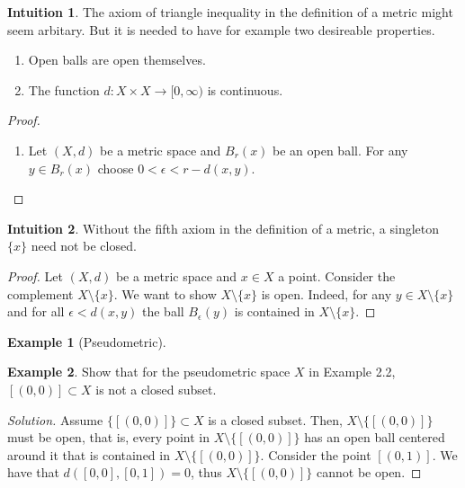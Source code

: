 \documentclass[a4paper]{book}
\theoremstyle{definition}
\newtheorem{example}{Example}[definition]
\newtheorem*{intuition}{Intuition}
\begin{document}
\begin{intbox}
    \begin{intuition}
        The axiom of triangle inequality in the definition of a metric might seem arbitary. But it is needed to have for example two desireable properties.
        \begin{enumerate}
            \item Open balls are open themselves.
            \item The function \(d: X \times X \longrightarrow [0, \infty)\) is continuous.
        \end{enumerate}
    \end{intuition}
\end{intbox}
\begin{proof}
    \begin{enumerate}
        \item Let \((X, d)\) be a metric space and \(B_r(x)\) be an open ball. For any \(y \in B_r(x)\) choose \(0 < \epsilon < r - d(x, y)\). 
    \end{enumerate}
\end{proof}
\begin{intbox}
    \begin{intuition}
        Without the fifth axiom in the definition of a metric, a singleton \(\{x\}\) need not be closed.
    \end{intuition}
\end{intbox}
\begin{proof}
    Let \((X, d)\) be a metric space and \(x \in X\) a point. Consider the complement \(X \setminus \{x\}\). We want to show \(X \setminus \{x\}\) is open. Indeed, for any \(y \in X \setminus \{x\}\) and for all \(\epsilon < d(x, y)\) the ball \(B_\epsilon(y)\) is contained in \(X \setminus \{x\}\).
\end{proof}

\begin{exmbox}
    \begin{example}[Pseudometric]
        
    \end{example}
\end{exmbox}

\begin{example}
    Show that for the pseudometric space \(X\) in Example 2.2, \([(0, 0)] \subset X\) is not a closed subset.
\end{example}
\begin{proof}[Solution]
    Assume \(\{[(0, 0)]\} \subset X\) is a closed subset. Then, \(X \setminus \{[(0, 0)]\}\) must be open, that is, every point in \(X \setminus \{[(0, 0)]\}\) has an open ball centered around it that is contained in \(X \setminus \{[(0, 0)]\}\). Consider the point \([(0, 1)]\). We have that \(d([0, 0], [0, 1]) = 0\), thus \(X \setminus \{[(0, 0)]\}\) cannot be open.
\end{proof}
\end{document}
